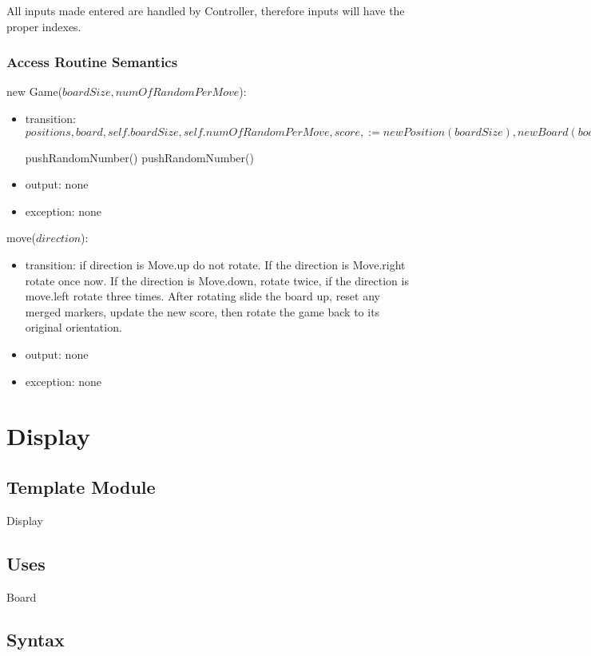 \documentclass[12pt]{article}
\begin{document}
All inputs made entered are handled by Controller, therefore inputs will have the proper indexes.

\subsubsection* {Access Routine Semantics}

\noindent new Game($boardSize, numOfRandomPerMove$):
\begin{itemize}
\item transition:
$positions, board, self.boardSize, self.numOfRandomPerMove, score, := new Position(boardSize), new Board(boardSize, positions), boardSize, numOfRandomPerMove, score$

pushRandomNumber()
pushRandomNumber()
\item output: none
\item exception: none
\end{itemize}

\noindent move($direction$):
\begin{itemize}
\item transition:
if direction is Move.up do not rotate. If the direction is Move.right rotate once now. If the direction is Move.down, rotate twice, if the direction is move.left rotate three times. After rotating slide the board up, reset any merged markers, update the new score, then rotate the game back to its original orientation.
\item output: none
\item exception: none
\end{itemize}

\newpage

\section* {Display}

\subsection*{Template Module}

Display

\subsection* {Uses}

Board

\subsection* {Syntax}
\end{document}
